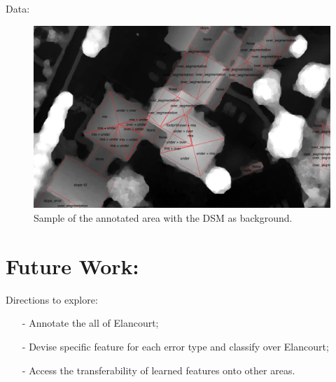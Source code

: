 \documentclass[9pt]{beamer}
\begin{document}
	\begin{frame}{Data:}
		\begin{figure}
			\begin{center}
				\caption{\label{img::annotation} Sample of the annotated area with the DSM as background.}
				\includegraphics[scale=.25]{errors_sample.png}
			\end{center}
		\end{figure}
	\end{frame}

	\section[Future]{Future Work:}

	\begin{frame}{Directions to explore:}
		
		\begin{itemize}
			\item[-] Annotate the all of Elancourt;
			\item[-] Devise specific feature for each error type and classify over Elancourt;
			\item[-] Access the transferability of learned features onto other areas.
		\end{itemize}
	\end{frame}
	
\end{document}
